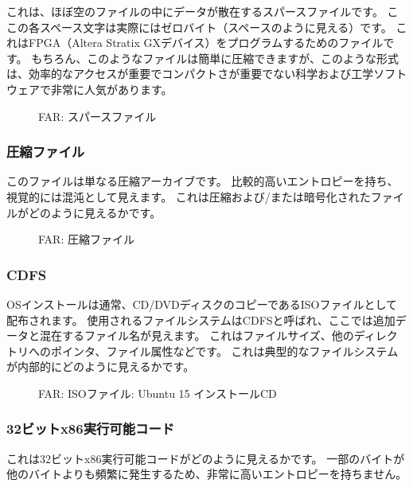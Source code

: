 これは、ほぼ空のファイルの中にデータが散在するスパースファイルです。
ここの各スペース文字は実際にはゼロバイト（スペースのように見える）です。
これはFPGA（Altera Stratix GXデバイス）をプログラムするためのファイルです。
もちろん、このようなファイルは簡単に圧縮できますが、このような形式は、効率的なアクセスが重要でコンパクトさが重要でない科学および工学ソフトウェアで非常に人気があります。

\begin{figure}[H]
\centering
{}
\caption{FAR: スパースファイル}
\end{figure}

\clearpage
\subsubsection{圧縮ファイル}

このファイルは単なる圧縮アーカイブです。
比較的高いエントロピーを持ち、視覚的には混沌として見えます。
これは圧縮および/または暗号化されたファイルがどのように見えるかです。

\begin{figure}[H]
\centering
{}
\caption{FAR: 圧縮ファイル}
\end{figure}

\clearpage
\subsubsection{\ac{CDFS}}

\ac{OS}インストールは通常、CD/DVDディスクのコピーであるISOファイルとして配布されます。
使用されるファイルシステムは\ac{CDFS}と呼ばれ、ここでは追加データと混在するファイル名が見えます。
これはファイルサイズ、他のディレクトリへのポインタ、ファイル属性などです。
これは典型的なファイルシステムが内部的にどのように見えるかです。

\begin{figure}[H]
\centering
{}
\caption{FAR: ISOファイル: Ubuntu 15 インストール\ac{CD}}
\end{figure}

\clearpage
\subsubsection{32ビットx86実行可能コード}

これは32ビットx86実行可能コードがどのように見えるかです。
一部のバイトが他のバイトよりも頻繁に発生するため、非常に高いエントロピーを持ちません。

